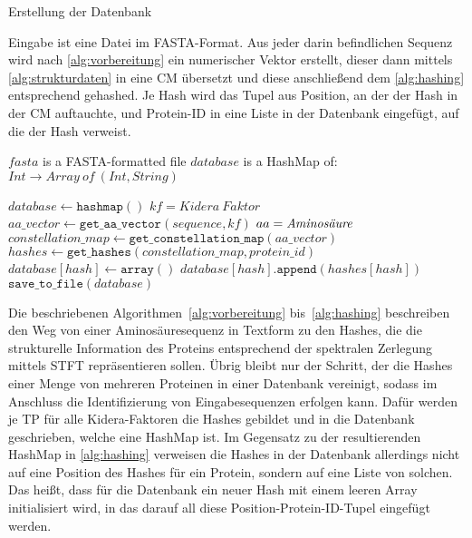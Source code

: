         \begin{algorithm}[H]
            \caption{Erstellung der Datenbank}\label{alg:datenbank}
            Eingabe ist eine Datei im FASTA-Format. Aus jeder darin befindlichen Sequenz wird nach \autoref{alg:vorbereitung} ein numerischer Vektor erstellt, dieser dann mittels \autoref{alg:strukturdaten} in eine \acl{CM} übersetzt und diese anschließend dem \autoref{alg:hashing} entsprechend gehashed. Je Hash wird das Tupel aus Position, an der der Hash in der \acl{CM} auftauchte, und Protein-ID in eine Liste in der Datenbank eingefügt, auf die der Hash verweist.
            \begin{algorithmic}[1]
                \Require $fasta$ is a FASTA-formatted file
                \Ensure $database$ is a HashMap of: $Int \rightarrow Array\ of\ (Int, String)$

                \State $database \gets \texttt{hashmap}()$
                     \Comment $kf=Kidera\ Faktor$
                        \State $aa\_vector \gets \texttt{get\_aa\_vector}(sequence, kf)$ \Comment $aa = \emph{Aminosäure}$
                        \State $constellation\_map \gets \texttt{get\_constellation\_map}(aa\_vector)$
                        \State $hashes \gets \texttt{get\_hashes}(constellation\_map, protein\_id)$
                                \State $database[hash] \gets \texttt{array}()$
                            \EndIf
                            \State $database[hash].\texttt{append}(hashes[hash])$
                        \EndFor
                    \EndFor
                \EndFor
                \State $\texttt{save\_to\_file}(database)$
            \end{algorithmic}
        \end{algorithm}

        Die beschriebenen Algorithmen~\ref{alg:vorbereitung} bis~\ref{alg:hashing} beschreiben den Weg von einer Aminosäuresequenz in Textform zu den Hashes, die die strukturelle Information des Proteins entsprechend der spektralen Zerlegung mittels \ac{STFT} repräsentieren sollen. Übrig bleibt nur der Schritt, der die Hashes einer Menge von mehreren Proteinen in einer Datenbank vereinigt, sodass im Anschluss die Identifizierung von Eingabesequenzen erfolgen kann. Dafür werden je \ac{TP} für alle Kidera-Faktoren die Hashes gebildet und in die Datenbank geschrieben, welche eine HashMap ist. Im Gegensatz zu der resultierenden HashMap in \autoref{alg:hashing} verweisen die Hashes in der Datenbank allerdings nicht auf eine Position des Hashes für ein Protein, sondern auf eine Liste von solchen. Das heißt, dass für die Datenbank ein neuer Hash mit einem leeren Array initialisiert wird, in das darauf all diese Position-Protein-ID-Tupel eingefügt werden.

